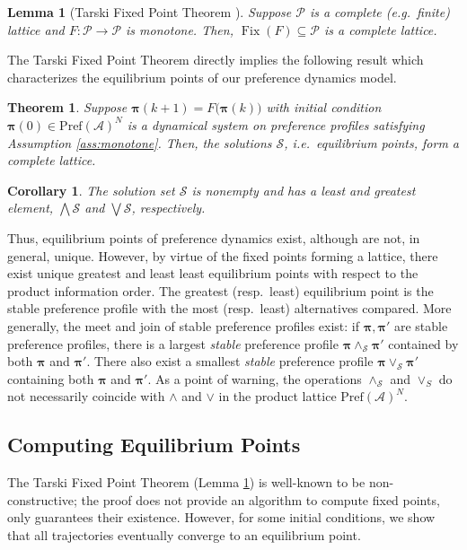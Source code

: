 \documentclass[conference]{ieeeconf}
\newcommand{\A}{\mathcal{A}}
\renewcommand{\P}{\mathcal{P}}
\renewcommand{\S}{\mathcal{S}}
\newcommand{\Pref}{\mathrm{Pref}}
\newcommand{\profile}{\boldsymbol{\pi}}
\newcommand{\join}{\vee}
\newcommand{\meet}{\wedge}
\newcommand{\bigjoin}{\bigvee}
\newcommand{\bigmeet}{\bigwedge}
\DeclareMathOperator{\Fix}{Fix}
\newtheorem{theorem}{Theorem}
\newtheorem{lemma}{Lemma}
\newtheorem{corollary}{Corollary}
\begin{document}
\begin{lemma}[Tarski Fixed Point Theorem \cite{tarski}] \label{lem:tfpt}
    Suppose $\P$ is a complete (e.g.~finite) lattice and $F: \P \to \P$ is monotone. Then, $\Fix(F) \subseteq \P$ is a complete lattice.
\end{lemma}

The Tarski Fixed Point Theorem directly implies the following result which characterizes the equilibrium points of our preference dynamics model.

\begin{theorem}
    Suppose $\profile(k+1) = F \bigl( \profile(k) \bigr)$ with initial condition $\profile(0) \in \Pref(\A)^N$ is a dynamical system on preference profiles satisfying Assumption \ref{ass:monotone}. Then, the solutions $\S$, i.e.~equilibrium points, form a complete lattice.
\end{theorem}
\begin{corollary}
    The solution set $\S$ is nonempty and has a least and greatest element, $\bigmeet \S$ and $\bigjoin \S$, respectively.
\end{corollary}

Thus, equilibrium points of preference dynamics exist, although are not, in general, unique. However, by virtue of the fixed points forming a lattice, there exist unique greatest and least least equilibrium points with respect to the product information order. The greatest (resp.~least) equilibrium point is the stable preference profile with the most (resp.~least) alternatives compared. More generally, the meet and join of stable preference profiles exist: if $\profile, \profile'$ are stable preference profiles, there is a largest \emph{stable} preference profile $\profile \meet_{\S} \profile'$ contained by both $\profile$ and $\profile'$. There also exist a smallest \emph{stable} preference profile $\profile \join_{\S} \profile'$ containing both $\profile$ and $\profile'$. As a point of warning, the operations $\meet_\S$ and $\join_S$ do not necessarily coincide with $\meet$ and $\join$ in the product lattice $\Pref(\A)^N$.



\subsection{Computing Equilibrium Points}



The Tarski Fixed Point Theorem (Lemma \ref{lem:tfpt}) is well-known to be non-constructive; the proof does not provide an algorithm to compute fixed points, only guarantees their existence. However, for some initial conditions, we show that all trajectories eventually converge to an equilibrium point.
\end{document}
